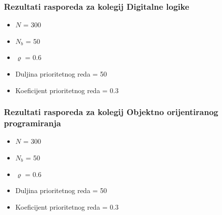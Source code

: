\documentclass{beamer}
\begin{document}
\begin{frame}
  \frametitle{Rezultati rasporeda za kolegij Digitalne logike}
  \begin{itemize}
    \item $N$ = 300
    \item $N_b$ = 50
    \item $\varrho$ = 0.6
    \item Duljina prioritetnog reda = 50
    \item Koeficijent prioritetnog reda = 0.3
  \end{itemize}

  \begin{table}
    \caption{Rezultati rasporeda za kolegij Digitalne logike}
    \label{tbl:diglog_300}
    \centering
  \end{table}
\end{frame}


\begin{frame}
  \frametitle{Rezultati rasporeda za kolegij Objektno orijentiranog programiranja}
  \begin{itemize}
    \item $N$ = 300
    \item $N_b$ = 50
    \item $\varrho$ = 0.6
    \item Duljina prioritetnog reda = 50
    \item Koeficijent prioritetnog reda = 0.3
  \end{itemize}
  \begin{table}
    \caption{Rezultati rasporeda za kolegij Objektno orijentiranog programiranja}
    \label{tbl:oop_300}
    \centering
  \end{table}
\end{frame}
\end{document}
